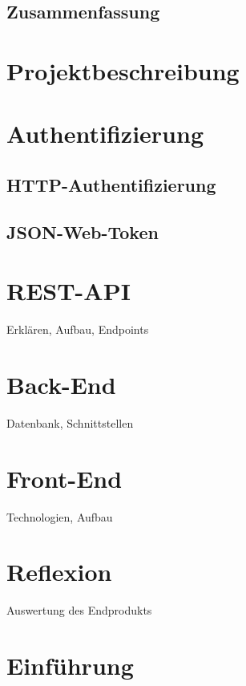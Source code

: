 







\section*{Zusammenfassung}	
\lipsum

\chapter{Projektbeschreibung}


\chapter{Authentifizierung}
\section{HTTP-Authentifizierung}
\section{JSON-Web-Token}

\chapter{REST-API}
Erklären, Aufbau, Endpoints

\chapter{Back-End}
Datenbank, Schnittstellen

\chapter{Front-End}
Technologien, Aufbau

\chapter{Reflexion}
Auswertung des Endprodukts

\chapter{Einführung}




